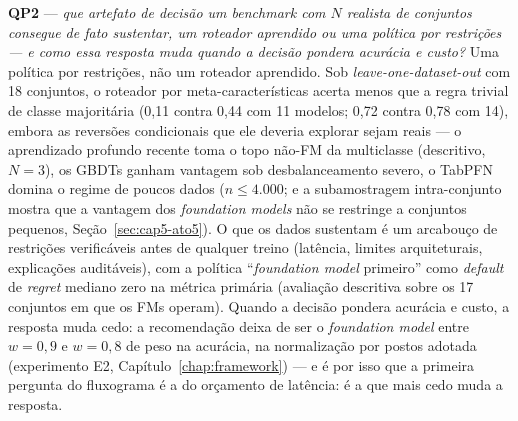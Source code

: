 \textbf{QP2} --- \emph{que artefato de decisão um benchmark com $N$
realista de conjuntos consegue de fato sustentar, um roteador
aprendido ou uma política por restrições --- e como essa resposta muda
quando a decisão pondera acurácia e custo?} Uma política por
restrições, não um roteador aprendido. Sob
\emph{leave-one-dataset-out} com 18 conjuntos, o roteador por
meta-características acerta menos que a regra trivial de classe
majoritária (0,11 contra 0,44 com 11 modelos; 0,72 contra 0,78 com
14), embora as reversões condicionais que ele deveria explorar sejam
reais --- o aprendizado profundo recente toma o topo não-FM da
multiclasse (descritivo, $N{=}3$), os GBDTs ganham vantagem sob
desbalanceamento severo, o TabPFN domina o regime de poucos dados
($n \leq 4.000$; e a subamostragem intra-conjunto mostra que a
vantagem dos \emph{foundation models} não se restringe a conjuntos
pequenos, Seção~\ref{sec:cap5-ato5}). O que os dados sustentam é um
arcabouço de restrições
verificáveis antes de qualquer treino (latência, limites
arquiteturais, explicações auditáveis), com a política
``\emph{foundation model} primeiro''
como \emph{default} de \emph{regret} mediano zero na métrica
primária (avaliação descritiva sobre os 17 conjuntos em que os FMs
operam).
Quando a decisão pondera acurácia e custo, a resposta muda cedo: a
recomendação deixa de ser o \emph{foundation model} entre $w{=}0{,}9$
e $w{=}0{,}8$ de peso na acurácia, na normalização por postos adotada
(experimento E2, Capítulo~\ref{chap:framework}) --- e é por isso que a
primeira pergunta do fluxograma é a do orçamento de latência: é a que
mais cedo muda a resposta.

